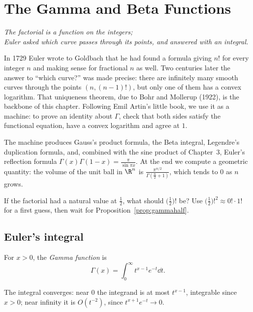 \chapter{The Gamma and Beta Functions}

\begin{center}\itshape
The factorial is a function on the integers;\\
Euler asked which curve passes through its points, and answered with an integral.
\end{center}

In 1729 Euler wrote to Goldbach that he had found a formula giving $n!$ for every integer $n$ and making sense for
fractional $n$ as well. Two centuries later the answer to ``which curve?'' was made precise: there are infinitely many
smooth curves through the points $(n,(n-1)!)$, but only one of them has a convex logarithm. That uniqueness theorem, due
to Bohr and Mollerup (1922), is the backbone of this chapter. Following Emil Artin's little book, we use it as a machine:
to prove an identity about $\Gamma$, check that both sides satisfy the functional equation, have a convex logarithm and
agree at $1$.

The machine produces Gauss's product formula, the Beta integral, Legendre's duplication formula, and, combined with the
sine product of Chapter~3, Euler's reflection formula $\Gamma(x)\Gamma(1-x)=\frac\pi{\sin\pi x}$. At the end we compute a geometric quantity: the volume of the unit ball in $\R^n$ is $\frac{\pi^{n/2}}{\Gamma(\frac n2+1)}$, which tends to $0$ as $n$ grows.

\begin{think}
If the factorial had a natural value at $\frac12$, what should $\bigl(\frac12\bigr)!$ be? Use $\bigl(\frac12\bigr)!^2\approx0!\cdot1!$ for a first
guess, then wait for Proposition~\ref{prop:gammahalf}.
\end{think}

\section{Euler's integral}

\begin{definition}
For $x>0$, the \emph{Gamma function} is
\[
\Gamma(x)=\int_0^\infty t^{x-1}e^{-t}\dd t.
\]
\end{definition}

The integral converges: near $0$ the integrand is at most $t^{x-1}$, integrable since $x>0$; near infinity it is
$O(t^{-2})$, since $t^{x+1}e^{-t}\to0$.

